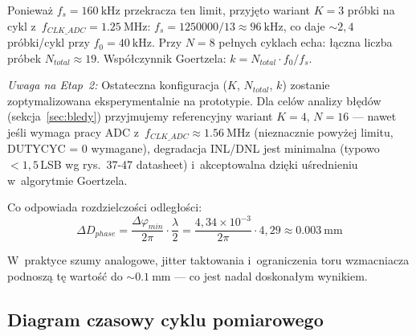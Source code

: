 \documentclass[a4paper,11pt]{article}
\begin{document}
	Ponieważ $f_s = \SI{160}{\kilo\hertz}$ przekracza ten limit, przyjęto wariant
	$K = 3$ próbki na cykl z~$f_{CLK\_ADC} = \SI{1,25}{\mega\hertz}$:
	$f_s = 1250000/13 \approx \SI{96}{\kilo\hertz}$, co daje ${\sim}2{,}4$ próbki/cykl
	przy $f_0 = \SI{40}{\kilo\hertz}$. Przy $N = 8$ pełnych cyklach echa: łączna
	liczba próbek $N_{total} \approx 19$. Współczynnik Goertzela:
	$k = N_{total} \cdot f_0/f_s$.
	
	\textit{Uwaga na Etap~2:} Ostateczna konfiguracja ($K$, $N_{total}$, $k$)
	zostanie zoptymalizowana eksperymentalnie na prototypie. Dla celów analizy
	błędów (sekcja~\ref{sec:bledy}) przyjmujemy referencyjny wariant $K = 4$,
	$N = 16$ --- nawet jeśli wymaga pracy ADC z~$f_{CLK\_ADC} \approx
	\SI{1,56}{\mega\hertz}$ (nieznacznie powyżej limitu, DUTYCYC = 0 wymagane),
	degradacja INL/DNL jest minimalna (typowo $< 1{,}5$\,LSB wg rys.~37-47
	datasheet) i~akceptowalna dzięki uśrednieniu w~algorytmie Goertzela.
	
	Co odpowiada rozdzielczości odległości:
	\begin{equation}
		\Delta D_{phase} = \frac{\Delta\varphi_{min}}{2\pi} \cdot \frac{\lambda}{2}
		= \frac{4{,}34 \times 10^{-3}}{2\pi} \cdot 4{,}29 \approx \SI{0,003}{\milli\metre}
		\label{eq:phase_dist_res}
	\end{equation}
	
	W~praktyce szumy analogowe, jitter taktowania i~ograniczenia toru wzmacniacza
	podnoszą tę wartość do ${\sim}\SI{0,1}{\milli\metre}$ --- co jest nadal doskonałym
	wynikiem.
	
	\subsection{Diagram czasowy cyklu pomiarowego}
	
\end{document}

